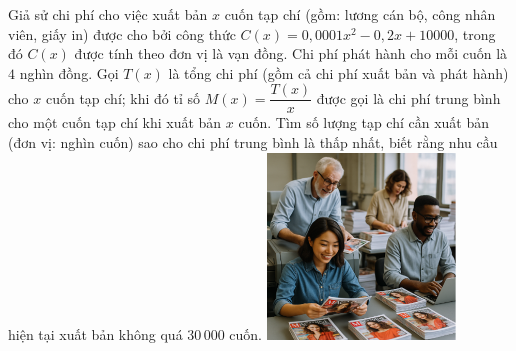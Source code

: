     \begin{ex}%
\immini
{
    Giả sử chi phí cho việc xuất bản $x$ cuốn tạp chí (gồm: lương cán bộ, công nhân viên, giấy in) được cho bởi công thức $C(x)=0{,}0001x^2-0,2x+10000$, trong đó $C(x)$ được tính theo đơn vị là vạn đồng. Chi phí phát hành cho mỗi cuốn là $4$ nghìn đồng. Gọi $T(x)$ là tổng chi phí (gồm cả chi phí xuất bản và phát hành) cho $ x$ cuốn tạp chí; khi đó tỉ số $ M(x)=\dfrac{T(x)}{x}$ được gọi là chi phí trung bình cho một cuốn tạp chí khi xuất bản $x$ cuốn. Tìm số lượng tạp chí cần xuất bản (đơn vị: nghìn cuốn) sao cho chi phí trung bình là thấp nhất, biết rằng nhu cầu hiện tại xuất bản không quá $30\,000$ cuốn.
}
{
\includegraphics[width=5cm]{img/HXN-10-18}
}
\end{ex}

